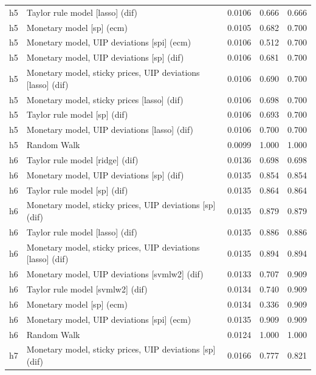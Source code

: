 \begin{ThreePartTable}
\begin{longtable}[t]{cp{5.5cm}ccc}
h5 & \raggedright Taylor rule model [lasso] (dif) & 0.0106 & 0.666 & 0.666\\
h5 & \raggedright Monetary model [sp] (ecm) & 0.0105 & 0.682 & 0.700\\
h5 & \raggedright Monetary model, UIP deviations [spi] (ecm) & 0.0106 & 0.512 & 0.700\\
h5 & \raggedright Monetary model, UIP deviations [sp] (dif) & 0.0106 & 0.681 & 0.700\\
h5 & \raggedright Monetary model, sticky prices, UIP deviations [lasso] (dif) & 0.0106 & 0.690 & 0.700\\
h5 & \raggedright Monetary model, sticky prices [lasso] (dif) & 0.0106 & 0.698 & 0.700\\
h5 & \raggedright Taylor rule model [sp] (dif) & 0.0106 & 0.693 & 0.700\\
h5 & \raggedright Monetary model, UIP deviations [lasso] (dif) & 0.0106 & 0.700 & 0.700\\
h5 & \raggedright Random Walk & 0.0099 & 1.000 & 1.000\\
\addlinespace
h6 & \raggedright Taylor rule model [ridge] (dif) & 0.0136 & 0.698 & 0.698\\
h6 & \raggedright Monetary model, UIP deviations [sp] (dif) & 0.0135 & 0.854 & 0.854\\
h6 & \raggedright Taylor rule model [sp] (dif) & 0.0135 & 0.864 & 0.864\\
h6 & \raggedright Monetary model, sticky prices, UIP deviations [sp] (dif) & 0.0135 & 0.879 & 0.879\\
h6 & \raggedright Taylor rule model [lasso] (dif) & 0.0135 & 0.886 & 0.886\\
h6 & \raggedright Monetary model, sticky prices, UIP deviations [lasso] (dif) & 0.0135 & 0.894 & 0.894\\
h6 & \raggedright Monetary model, UIP deviations [svmlw2] (dif) & 0.0133 & 0.707 & 0.909\\
h6 & \raggedright Taylor rule model [svmlw2] (dif) & 0.0134 & 0.740 & 0.909\\
h6 & \raggedright Monetary model [sp] (ecm) & 0.0134 & 0.336 & 0.909\\
h6 & \raggedright Monetary model, UIP deviations [spi] (ecm) & 0.0135 & 0.909 & 0.909\\
h6 & \raggedright Random Walk & 0.0124 & 1.000 & 1.000\\
\addlinespace
h7 & \raggedright Monetary model, sticky prices, UIP deviations [sp] (dif) & 0.0166 & 0.777 & 0.821\\

\end{longtable}
\end{ThreePartTable}
